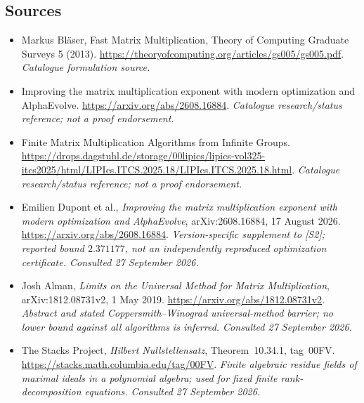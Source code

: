 \documentclass[11pt,a4paper]{article}
\numberwithin{equation}{section}
\begin{document}
\subsection{Sources}
\begin{itemize}\raggedright
\item[\textnormal{[S1]}]\hypertarget{source:statement:1}{} Markus Bläser, Fast Matrix Multiplication, Theory of Computing Graduate Surveys 5 (2013).
\url{https://theoryofcomputing.org/articles/gs005/gs005.pdf}.
{\small\textit{Catalogue formulation source.}}
\item[\textnormal{[S2]}]\hypertarget{source:statement:2}{} Improving the matrix multiplication exponent with modern optimization and AlphaEvolve.
\url{https://arxiv.org/abs/2608.16884}.
{\small\textit{Catalogue research/status reference; not a proof endorsement.}}
\item[\textnormal{[S3]}]\hypertarget{source:statement:3}{} Finite Matrix Multiplication Algorithms from Infinite Groups.
\url{https://drops.dagstuhl.de/storage/00lipics/lipics-vol325-itcs2025/html/LIPIcs.ITCS.2025.18/LIPIcs.ITCS.2025.18.html}.
{\small\textit{Catalogue research/status reference; not a proof endorsement.}}
\item[\textnormal{[E1]}]\hypertarget{extra:statement:1}{} Emilien Dupont et al.,
\emph{Improving the matrix multiplication exponent with modern optimization
and AlphaEvolve}, arXiv:2608.16884, 17 August 2026.
\url{https://arxiv.org/abs/2608.16884}.
{\small\textit{Version-specific supplement to [S2]; reported bound
$2.371177$, not an independently reproduced optimization certificate.
Consulted 27 September 2026.}}
\item[\textnormal{[E2]}]\hypertarget{extra:statement:2}{} Josh Alman,
\emph{Limits on the Universal Method for Matrix Multiplication},
arXiv:1812.08731v2, 1 May 2019.
\url{https://arxiv.org/abs/1812.08731v2}.
{\small\textit{Abstract and stated Coppersmith--Winograd universal-method
barrier; no lower bound against all algorithms is inferred.
Consulted 27 September 2026.}}
\item[\textnormal{[E3]}]\hypertarget{extra:statement:3}{} The Stacks Project,
\emph{Hilbert Nullstellensatz}, Theorem~10.34.1, tag~00FV.
\url{https://stacks.math.columbia.edu/tag/00FV}.
{\small\textit{Finite algebraic residue fields of maximal ideals in a
polynomial algebra; used for fixed finite rank-decomposition equations.
Consulted 27 September 2026.}}

\end{itemize}

\end{document}
